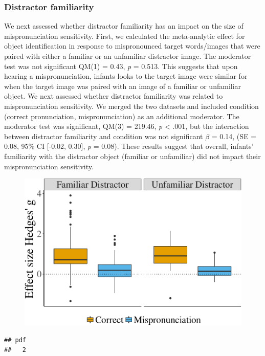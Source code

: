 \documentclass[man]{apa6}
\theoremstyle{definition}
\theoremstyle{definition}
\theoremstyle{definition}
\theoremstyle{remark}
\begin{document}
\subsubsection{Distractor familiarity}\label{distractor-familiarity}

We next assessed whether distractor familiarity has an impact on the
size of mispronunciation sensitivity. First, we calculated the
meta-analytic effect for object identification in response to
mispronounced target words/images that were paired with either a
familiar or an unfamiliar distractor image. The moderator test was not
significant QM(1) = 0.43, \emph{p} = 0.513. This suggests that upon
hearing a mispronunciation, infants looks to the target image were
similar for when the target image was paired with an image of a familiar
or unfamiliar object. We next assessed whether distractor familiarity
was related to mispronunciation sensitivity. We merged the two datasets
and included condition (correct pronunciation, mispronunciation) as an
additional moderator. The moderator test was significant, QM(3) =
219.46, \emph{p} \textless{} .001, but the interaction between
distractor familiarity and condition was not significant \(\beta\) =
0.14, (SE = 0.08, 95\% CI {[}-0.02, 0.30{]}, \emph{p} = 0.08). These
results suggest that overall, infants' familiarity with the distractor
object (familiar or unfamiliar) did not impact their mispronunciation
sensitivity.

\begin{figure}[htbp]
\centering
\includegraphics{Paper_Analyses_files/figure-latex/PlotDistFamEffect_NoAge-1.pdf}
\caption{}
\end{figure}

\begin{verbatim}
## pdf 
##   2
\end{verbatim}
\end{document}
